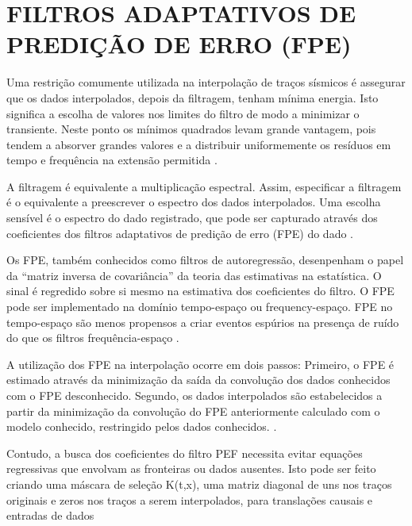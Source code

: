 %
% 
% 
% 
% 
% 
% 

\chapter{FILTROS ADAPTATIVOS DE PREDIÇÃO DE ERRO (FPE)}

Uma restrição comumente utilizada na interpolação de traços sísmicos
é assegurar que os dados interpolados, depois da filtragem,
tenham mínima energia. Isto significa a escolha de valores
nos limites do filtro de modo a minimizar o transiente. Neste ponto os mínimos
quadrados levam grande vantagem, pois tendem a absorver grandes valores e a distribuir
uniformemente os resíduos em tempo e frequência na extensão permitida \cite{claerbout92}.

A filtragem é equivalente a multiplicação espectral. Assim, especificar a filtragem
é o equivalente a preescrever o espectro dos dados interpolados. Uma escolha sensível
é o espectro do dado registrado, que pode ser capturado através dos coeficientes dos
filtros adaptativos de predição de erro (FPE) do dado \cite{spitz}. 

Os FPE, também conhecidos como filtros de autoregressão, desenpenham o
papel da ``matriz inversa de covariância'' da teoria das estimativas na estatística.
O sinal é regredido sobre si mesmo na estimativa dos coeficientes do filtro. O FPE
pode ser implementado na domínio tempo-espaço ou frequency-espaço. FPE no tempo-espaço
são menos propensos a criar eventos espúrios na presença de ruído do que os filtros
frequência-espaço \cite{abma}. 

A utilização dos FPE na interpolação ocorre em dois passos:
Primeiro, o FPE é estimado através da minimização da saída da convolução
dos dados conhecidos com o FPE desconhecido. Segundo, os dados interpolados
são estabelecidos a partir da minimização da convolução do FPE anteriormente 
calculado com o modelo conhecido, restringido pelos dados conhecidos. \cite{curry}.

Contudo, a busca dos coeficientes do filtro PEF necessita evitar equações regressivas que envolvam as fronteiras ou dados ausentes. Isto pode ser feito
criando uma máscara de seleção K(t,x), uma matriz 
diagonal de uns nos traços originais e zeros nos traços a serem interpolados, 
para translações causais e entradas de dados \cite{claerbout10}

